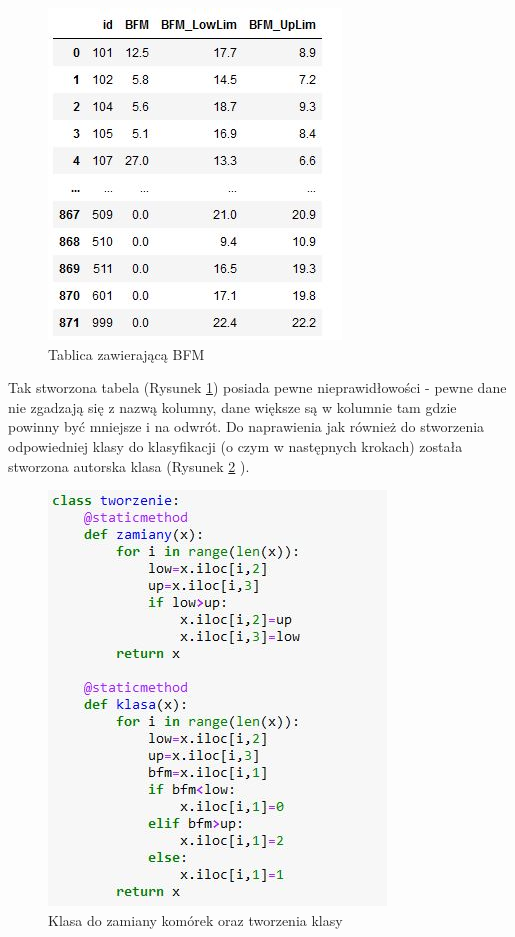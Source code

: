 \documentclass{article}
\begin{document}
    \begin{figure}[ht!]
		\centering
		\includegraphics[width=.45\textwidth]{ss/1.JPG}
		\caption{Tablica zawierającą BFM}
		\label{tab:bfm}
	\end{figure}

	Tak stworzona tabela (Rysunek \ref{tab:bfm}) posiada pewne nieprawidłowości - pewne dane nie zgadzają się z nazwą kolumny, dane większe są w kolumnie tam gdzie powinny być mniejsze i na odwrót. Do naprawienia jak również do stworzenia odpowiedniej klasy do klasyfikacji (o czym w następnych krokach) została stworzona autorska klasa (Rysunek \ref{tab:klasa} ).
	
	 \begin{figure}[ht!]
		\centering
		\includegraphics[width=.52\textwidth]{ss/2.JPG}
		\caption{Klasa do zamiany komórek oraz tworzenia klasy}
		\label{tab:klasa}
	\end{figure}
	
\end{document}

